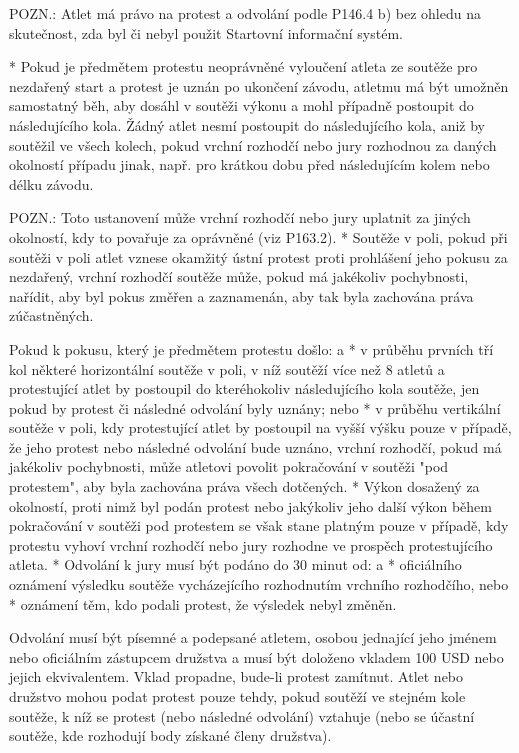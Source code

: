   POZN.: Atlet má právo na protest a odvolání podle P146.4 b) bez ohledu na skutečnost, zda byl či nebyl použit Startovní informační systém.

  * Pokud je předmětem protestu neoprávněné vyloučení atleta ze soutěže pro nezdařený start a protest je uznán po ukončení závodu, atletmu má být umožněn samostatný běh, aby dosáhl v soutěži výkonu a mohl případně postoupit do následujícího kola. Žádný atlet nesmí postoupit do následujícího kola, aniž by soutěžil ve všech kolech, pokud vrchní rozhodčí nebo jury rozhodnou za daných okolností případu jinak, např. pro krátkou dobu před následujícím kolem nebo délku závodu.

  POZN.: Toto ustanovení může vrchní rozhodčí nebo jury uplatnit za jiných okolností, kdy to povařuje za oprávněné (viz P163.2).
  \enditems
* Soutěže v poli, pokud při soutěži v poli atlet vznese okamžitý ústní protest proti prohlášení jeho pokusu za nezdařený, vrchní rozhodčí soutěže může, pokud má jakékoliv pochybnosti, nařídit, aby byl pokus změřen a zaznamenán, aby tak byla zachována práva zúčastněných.

Pokud k pokusu, který je předmětem protestu došlo:
  \begitems \style a
  * v průběhu prvních tří kol některé horizontální soutěže v poli, v níž soutěží více než 8 atletů a protestující atlet by postoupil do kteréhokoliv následujícího kola soutěže, jen pokud by protest či následné odvolání byly uznány; nebo
  * v průběhu vertikální soutěže v poli, kdy protestující atlet by postoupil na vyšší výšku pouze v případě, že jeho protest nebo následné odvolání bude uznáno, vrchní rozhodčí, pokud má jakékoliv pochybnosti, může atletovi povolit pokračování v soutěži "pod protestem", aby byla zachována práva všech dotčených.
  \enditems
* Výkon dosažený za okolností, proti nimž byl podán protest nebo jakýkoliv jeho další výkon během pokračování v soutěži pod protestem se však stane platným pouze v případě, kdy protestu vyhoví vrchní rozhodčí nebo jury rozhodne ve prospěch protestujícího atleta.
* Odvolání k jury musí být podáno do 30 minut od:
  \begitems \style a
  * oficiálního oznámení výsledku soutěže vycházejícího rozhodnutím vrchního rozhodčího, nebo
  * oznámení těm, kdo podali protest, že výsledek nebyl změněn.
  \enditems

Odvolání musí být písemné a podepsané atletem, osobou jednající jeho jménem nebo oficiálním zástupcem družstva a musí být doloženo vkladem 100 USD nebo jejich ekvivalentem. Vklad propadne, bude-li protest zamítnut. Atlet nebo družstvo mohou podat protest pouze tehdy, pokud soutěží ve stejném kole soutěže, k níž se protest (nebo následné odvolání) vztahuje (nebo se účastní soutěže, kde rozhodují body získané členy družstva).

